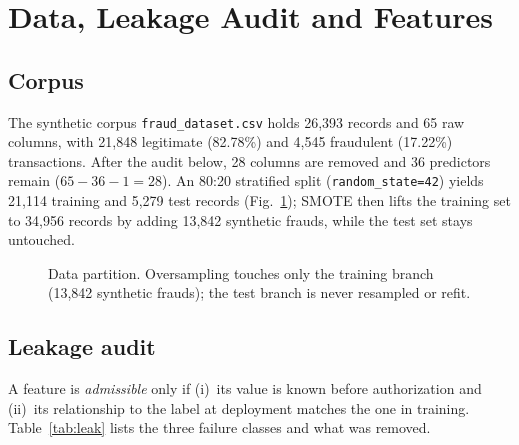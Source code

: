 \documentclass[conference]{IEEEtran}
\begin{document}
\section{Data, Leakage Audit and Features}
\subsection{Corpus}
The synthetic corpus \texttt{fraud\_\allowbreak{}dataset.csv} holds 26,393 records and 65 raw columns, with 21,848 legitimate (82.78\%) and 4,545 fraudulent (17.22\%) transactions. After the audit below, 28 columns are removed and 36 predictors remain ($65-36-1=28$). An 80:20 stratified split (\texttt{random\_\allowbreak{}state=42}) yields 21,114 training and 5,279 test records (Fig.~\ref{fig:split}); SMOTE then lifts the training set to 34,956 records by adding 13,842 synthetic frauds, while the test set stays untouched.

\begin{figure}[!t]
\centering
{}
\caption{Data partition. Oversampling touches only the training branch (13,842 synthetic frauds); the test branch is never resampled or refit.}
\label{fig:split}
\end{figure}

\subsection{Leakage audit}
A feature is \emph{admissible} only if (i)~its value is known before authorization and (ii)~its relationship to the label at deployment matches the one in training. Table~\ref{tab:leak} lists the three failure classes and what was removed.
\end{document}
